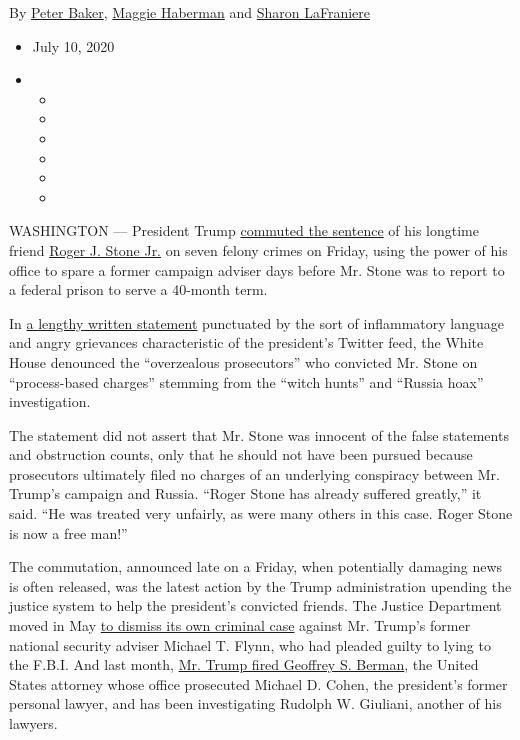 By \href{https://www.nytimes.com/by/peter-baker}{Peter Baker},
\href{https://www.nytimes.com/by/maggie-haberman}{Maggie Haberman} and
\href{https://www.nytimes.com/by/sharon-lafraniere}{Sharon LaFraniere}

\begin{itemize}
\item
  July 10, 2020
\item
  \begin{itemize}
  \item
  \item
  \item
  \item
  \item
  \item
  \end{itemize}
\end{itemize}

WASHINGTON --- President Trump
\href{https://www.nytimes.com/article/trump-pardons-commutations.html}{commuted
the sentence} of his longtime friend
\href{https://www.nytimes.com/2020/07/19/us/politics/roger-stone-mo-kelly-slur.html}{Roger
J. Stone Jr.} on seven felony crimes on Friday, using the power of his
office to spare a former campaign adviser days before Mr. Stone was to
report to a federal prison to serve a 40-month term.

In
\href{https://www.whitehouse.gov/briefings-statements/statement-press-secretary-regarding-executive-grant-clemency-roger-stone-jr/}{a
lengthy written statement} punctuated by the sort of inflammatory
language and angry grievances characteristic of the president's Twitter
feed, the White House denounced the ``overzealous prosecutors'' who
convicted Mr. Stone on ``process-based charges'' stemming from the
``witch hunts'' and ``Russia hoax'' investigation.

The statement did not assert that Mr. Stone was innocent of the false
statements and obstruction counts, only that he should not have been
pursued because prosecutors ultimately filed no charges of an underlying
conspiracy between Mr. Trump's campaign and Russia. ``Roger Stone has
already suffered greatly,'' it said. ``He was treated very unfairly, as
were many others in this case. Roger Stone is now a free man!''

The commutation, announced late on a Friday, when potentially damaging
news is often released, was the latest action by the Trump
administration upending the justice system to help the president's
convicted friends. The Justice Department moved in May
\href{https://www.nytimes.com/2020/05/07/us/politics/michael-flynn-case-dropped.html}{to
dismiss its own criminal case} against Mr. Trump's former national
security adviser Michael T. Flynn, who had pleaded guilty to lying to
the F.B.I. And last month,
\href{https://www.nytimes.com/2020/06/20/nyregion/trump-geoffrey-berman-fired-sdny.html}{Mr.
Trump fired Geoffrey S. Berman}, the United States attorney whose office
prosecuted Michael D. Cohen, the president's former personal lawyer, and
has been investigating Rudolph W. Giuliani, another of his lawyers.


